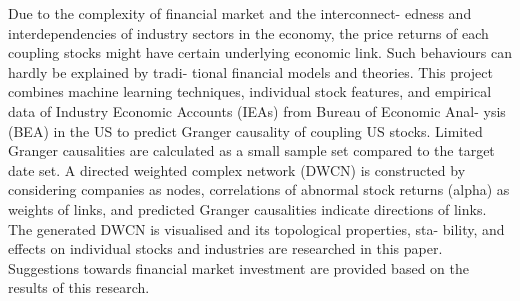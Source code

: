 \abstracttitle
%
{\singlespacing
Due to the complexity of financial market and the interconnect- edness and interdependencies of industry sectors in the economy, the price returns of each coupling stocks might have certain underlying economic link. Such behaviours can hardly be explained by tradi- tional financial models and theories. This project combines machine learning techniques, individual stock features, and empirical data of Industry Economic Accounts (IEAs) from Bureau of Economic Anal- ysis (BEA) in the US to predict Granger causality of coupling US stocks. Limited Granger causalities are calculated as a small sample set compared to the target date set. A directed weighted complex network (DWCN) is constructed by considering companies as nodes, correlations of abnormal stock returns (alpha) as weights of links, and predicted Granger causalities indicate directions of links. The generated DWCN is visualised and its topological properties, sta- bility, and effects on individual stocks and industries are researched in this paper. Suggestions towards financial market investment are provided based on the results of this research.
}

